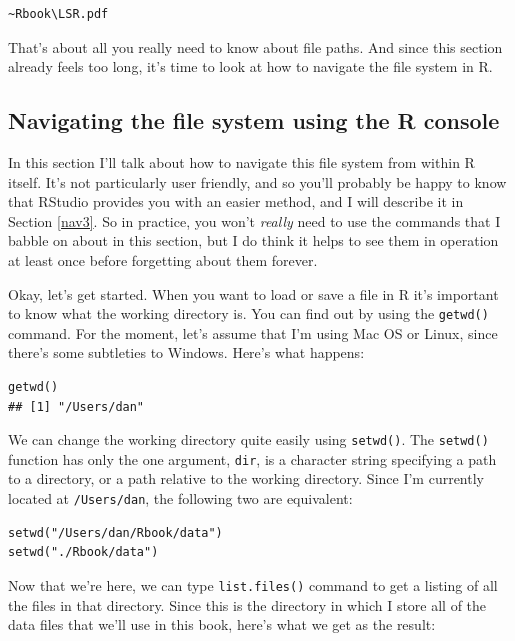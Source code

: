 \documentclass[
]{book}
\begin{document}
\begin{verbatim}
~Rbook\LSR.pdf
\end{verbatim}

That's about all you really need to know about file paths. And since this section already feels too long, it's time to look at how to navigate the file system in R.

\hypertarget{navigationR}{%
\subsection{Navigating the file system using the R console}\label{navigationR}}

In this section I'll talk about how to navigate this file system from within R itself. It's not particularly user friendly, and so you'll probably be happy to know that RStudio provides you with an easier method, and I will describe it in Section \ref{nav3}. So in practice, you won't \emph{really} need to use the commands that I babble on about in this section, but I do think it helps to see them in operation at least once before forgetting about them forever.

Okay, let's get started. When you want to load or save a file in R it's important to know what the working directory is. You can find out by using the \texttt{getwd()} command. For the moment, let's assume that I'm using Mac OS or Linux, since there's some subtleties to Windows. Here's what happens:

\begin{verbatim}
getwd()
## [1] "/Users/dan"
\end{verbatim}

We can change the working directory quite easily using \texttt{setwd()}. The \texttt{setwd()} function has only the one argument, \texttt{dir}, is a character string specifying a path to a directory, or a path relative to the working directory. Since I'm currently located at \texttt{/Users/dan}, the following two are equivalent:

\begin{verbatim}
setwd("/Users/dan/Rbook/data")
setwd("./Rbook/data")
\end{verbatim}

Now that we're here, we can type \texttt{list.files()} command to get a listing of all the files in that directory. Since this is the directory in which I store all of the data files that we'll use in this book, here's what we get as the result:
\end{document}
